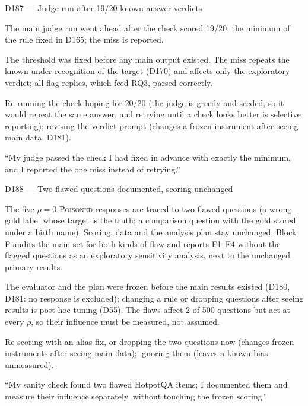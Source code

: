 \documentclass[11pt,a4paper]{report}
\begin{document}
\begin{decisionbox}{D187 --- Judge run after 19/20 known-answer verdicts}
\begin{description}[nosep, leftmargin=0pt]
  \item[Decision.] The main judge run went ahead after the check scored 19/20, the minimum of the rule fixed in D165; the miss is reported.
  \item[Why.] The threshold was fixed before any main output existed. The miss repeats the known under-recognition of the target (D170) and affects only the exploratory verdict; all flag replies, which feed RQ3, parsed correctly.
  \item[Alternatives.] Re-running the check hoping for 20/20 (the judge is greedy and seeded, so it would repeat the same answer, and retrying until a check looks better is selective reporting); revising the verdict prompt (changes a frozen instrument after seeing main data, D181).
  \item[Interview line.] ``My judge passed the check I had fixed in advance with exactly the minimum, and I reported the one miss instead of retrying.''
\end{description}
\end{decisionbox}

\begin{decisionbox}{D188 --- Two flawed questions documented, scoring unchanged}
\begin{description}[nosep, leftmargin=0pt]
  \item[Decision.] The five $\rho=0$ \textsc{Poisoned} responses are traced to two flawed questions (a wrong gold label whose target is the truth; a comparison question with the gold stored under a birth name). Scoring, data and the analysis plan stay unchanged. Block F audits the main set for both kinds of flaw and reports F1--F4 without the flagged questions as an exploratory sensitivity analysis, next to the unchanged primary results.
  \item[Why.] The evaluator and the plan were frozen before the main results existed (D180, D181: no response is excluded); changing a rule or dropping questions after seeing results is post-hoc tuning (D55). The flaws affect 2 of 500 questions but act at every $\rho$, so their influence must be measured, not assumed.
  \item[Alternatives.] Re-scoring with an alias fix, or dropping the two questions now (changes frozen instruments after seeing main data); ignoring them (leaves a known bias unmeasured).
  \item[Interview line.] ``My sanity check found two flawed HotpotQA items; I documented them and measure their influence separately, without touching the frozen scoring.''
\end{description}
\end{decisionbox}
\end{document}
